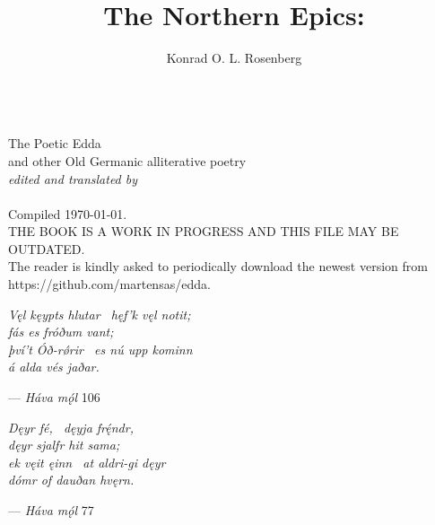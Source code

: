 \title{The Northern Epics:}
\author{Konrad O. L. Rosenberg}

\begin{titlingpage}
  \makeatletter
  \centering
  \HUGE \textsc{\@title} \\
  \Huge The Poetic Edda \\
  \huge and other Old Germanic alliterative poetry \\
  \vspace{1cm}
  \Large\emph{edited and translated by} \\
  \vspace{1cm}
  \huge \@author \\
  \vspace{4cm}
  \Large Compiled \today. \\
  \vspace{1cm}
  THE BOOK IS A WORK IN PROGRESS AND THIS FILE MAY BE OUTDATED. \\
  The reader is kindly asked to periodically download the newest version from https://github.com/martensas/edda.
  \makeatother
\end{titlingpage}

\newpage\thispagestyle{empty}

\vspace*{\fill}

\begin{center}{\Large \emph{Vęl kęypts hlutar \hld\ hęf’k vęl notit; \\
fás es fróðum vant; \\
því’t Óð-rǿrir \hld\ es nú upp kominn \\
á alda vés jaðar.}}\end{center}

\begin{flushright}%
— \emph{Háva mǫ́l} 106%
\end{flushright}

\vspace{5mm}

\begin{center}{\Large \emph{Dęyr fé, \hld\ dęyja frę́ndr, \\
dęyr sjalfr hit sama; \\
ek vęit ęinn \hld\ at aldri-gi dęyr \\
dómr of dauðan hvęrn.}}\end{center}

\begin{flushright}%
— \emph{Háva mǫ́l} 77%
\end{flushright}

